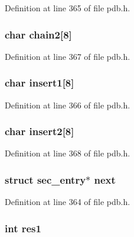 Definition at line 365 of file pdb.\-h.

\hypertarget{structsec__entry_a0b12586562770f31367fa9a7af4a1b09}{
\subsubsection[{chain2}]{\setlength{\rightskip}{0pt plus 5cm}char chain2\mbox{[}8\mbox{]}}}\label{structsec__entry_a0b12586562770f31367fa9a7af4a1b09}


Definition at line 367 of file pdb.\-h.

\hypertarget{structsec__entry_a40813cb2e390608ac9828d857950ffd1}{
\subsubsection[{insert1}]{\setlength{\rightskip}{0pt plus 5cm}char insert1\mbox{[}8\mbox{]}}}\label{structsec__entry_a40813cb2e390608ac9828d857950ffd1}


Definition at line 366 of file pdb.\-h.

\hypertarget{structsec__entry_aa36703384eb0aaa384cc934ddfee1882}{
\subsubsection[{insert2}]{\setlength{\rightskip}{0pt plus 5cm}char insert2\mbox{[}8\mbox{]}}}\label{structsec__entry_aa36703384eb0aaa384cc934ddfee1882}


Definition at line 368 of file pdb.\-h.

\hypertarget{structsec__entry_a4d3b6eefdc705fac914bf5542b4392e9}{
\subsubsection[{next}]{\setlength{\rightskip}{0pt plus 5cm}struct {\bf sec\-\_\-entry}$\ast$ next}}\label{structsec__entry_a4d3b6eefdc705fac914bf5542b4392e9}


Definition at line 364 of file pdb.\-h.

\hypertarget{structsec__entry_ab0c79f65dfbf2f2f2d7e108f73fe6f18}{
\subsubsection[{res1}]{\setlength{\rightskip}{0pt plus 5cm}int res1}}\label{structsec__entry_ab0c79f65dfbf2f2f2d7e108f73fe6f18}


